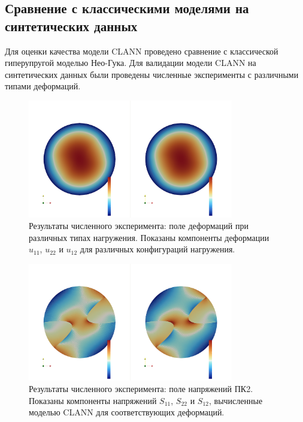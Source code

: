 \subsection{Сравнение с классическими моделями на синтетических данных}
Для оценки качества модели CLANN проведено сравнение с классической гиперупругой моделью Нео-Гука.
Для валидации модели CLANN на синтетических данных были проведены численные эксперименты с различными типами деформаций. 

\begin{figure}[htbp]
\centering
\includegraphics[width=0.8\textwidth]{img/bx_inf_u.png}
\caption{Результаты численного эксперимента: поле деформаций при различных типах нагружения. Показаны компоненты деформации $u_{11}$, $u_{22}$ и $u_{12}$ для различных конфигураций нагружения.}
\label{fig:numerical_deformations}
\end{figure}

\begin{figure}[htbp]
\centering
\includegraphics[width=0.8\textwidth]{img/bx_inf_S.png}
\caption{Результаты численного эксперимента: поле напряжений ПК2. Показаны компоненты напряжений $S_{11}$, $S_{22}$ и $S_{12}$, вычисленные моделью CLANN для соответствующих деформаций.}
\label{fig:numerical_stresses}
\end{figure}

